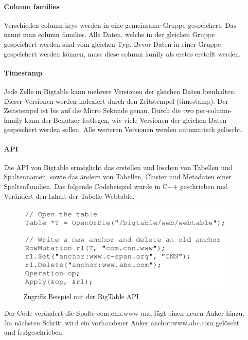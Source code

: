 \paragraph{Column families}
Verschieden column keys werden in eine gemeinsame Gruppe gespeichert. Das nennt man column families. Alle Daten, welche in der gleichen Gruppe gespeichert werden sind vom gleichen Typ. Bevor Daten in einer Gruppe gespeichert werden können, muss diese column family als erstes erstellt werden.

\paragraph{Timestamp}
Jede Zelle in Bigtable kann mehrere Versionen der gleichen Daten beinhalten. Dieser Versionen werden indexiert durch den Zeitstempel (timestamp). Der Zeitstempel ist bis auf die Micro Sekunde genau. Durch die \glqq two per-column-family \grqq kann der Benutzer festlegen, wie viele Versionen der gleichen Daten gespeichert werden sollen. Alle weiteren Versionen werden automatisch gelöscht.

\paragraph{API}
Die API von Bigtable ermöglicht das erstellen und löschen von Tabellen und Spaltennamen, sowie das ändern von Tabellen, Cluster und Metadaten einer Spaltenfamilien. Das folgende Codebeispiel wurde in C++ geschrieben und Verändert den Inhalt der Tabelle Webtable. 

\begin{figure}[!htpb]
	\centering
	\includegraphics[]{pics/bigtable_api.png}
	\caption {Zugriffs Beispiel mit der BigTable API}
\end{figure}

Der Code verändert die Spalte \glqq com.cnn.www \grqq und fügt einen neuen Anker hinzu. Im nächsten Schritt wird ein vorhandener Anker \glqq anchor:www.abc.com \grqq gelöscht und festgeschrieben.


